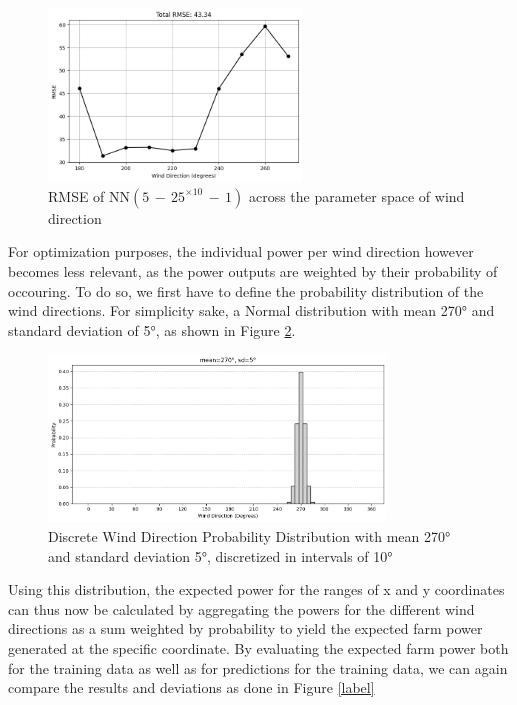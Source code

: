 \begin{figure}[h] 
	\centering
	\includegraphics[width=0.6\textwidth]{figures/optimization/rmse_dist_10layers25nodes.png}
	\caption{RMSE of  $\text{NN}(5\,{-}\,25^{\times10}\,{-}\,1)$ across the parameter space of wind direction }
	\label{fig:rmse_dist_10layers25nodes}
\end{figure}


For optimization purposes, the individual power per wind direction however becomes less relevant, as the power outputs are weighted by their probability of occouring. 
To do so, we first have to define the probability distribution of the wind directions. For simplicity sake, a Normal distribution with mean 270° and standard deviation of 5°, as shown in Figure \ref{fig:wind_dist_opti}.


\begin{figure}[h] 
	\centering
	\includegraphics[width=0.8\textwidth]{figures/optimization/wind_dist_opti.png} 
	\caption{Discrete Wind Direction Probability Distribution with mean 270° and standard deviation 5°, discretized in intervals of 10° }
	\label{fig:wind_dist_opti}
\end{figure}


Using this distribution, the expected power for the ranges of x and y coordinates can thus now be calculated by aggregating the powers for the different wind directions as a sum weighted by probability to yield the expected farm power generated at the specific coordinate. By evaluating the expected farm power both for the training data as well as for predictions for the training data, we can again compare the results and deviations as done in Figure \ref{label} 

